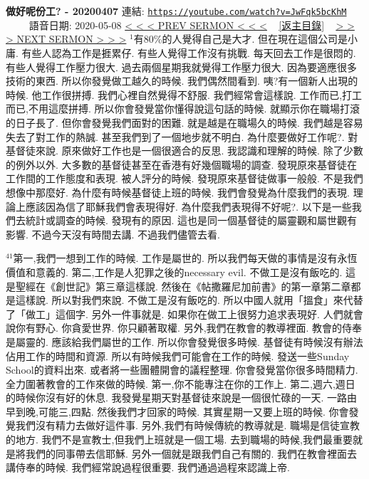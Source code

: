 \documentclass{book}
\begin{document}
\section{}
\label{sec:JwFqk5bcKhM}
\textbf{做好呢份工? - 20200407}
\newline
\newline
連結: \href{https://youtube.com/watch?v=JwFqk5bcKhM}{\texttt{https://youtube.com/watch?v=JwFqk5bcKhM}} ~~~~ 語音日期: 2020-05-08
\newline
\newline
\hyperref[sec:UCyv23j5rVY]{\small{< < < PREV SERMON < < <}}
~
\hyperref[sec:index]{\small{[返主目錄]}}
~
\hyperref[sec:9pqygotXAuo]{\small{> > > NEXT SERMON > > >}}
\newline
\newline
$^{1}$有80\%的人覺得自己是大才.
但在現在這個公司是小庸.
有些人認為工作是捱累仔.
有些人覺得工作沒有挑戰.
每天回去工作是很悶的.
有些人覺得工作壓力很大.
過去兩個星期我就覺得工作壓力很大.
因為要適應很多技術的東西.
所以你發覺做工越久的時候.
我們偶然間看到.
咦?有一個新人出現的時候.
他工作很拼搏.
我們心裡自然覺得不舒服.
我們經常會這樣說.
工作而已,打工而已,不用這麼拼搏.
所以你會發覺當你懂得說這句話的時候.
就顯示你在職場打滾的日子長了.
但你會發覺我們面對的困難.
就是越是在職場久的時候.
我們越是容易失去了對工作的熱誠.
甚至我們到了一個地步就不明白.
為什麼要做好工作呢?.
對基督徒來說.
原來做好工作也是一個很適合的反思.
我認識和理解的時候.
除了少數的例外以外.
大多數的基督徒甚至在香港有好幾個職場的調查.
發現原來基督徒在工作間的工作態度和表現.
被人評分的時候.
發現原來基督徒做事一般般.
不是我們想像中那麼好.
為什麼有時候基督徒上班的時候.
我們會發覺為什麼我們的表現.
理論上應該因為信了耶穌我們會表現得好.
為什麼我們表現得不好呢?.
以下是一些我們去統計或調查的時候.
發現有的原因.
這也是同一個基督徒的屬靈觀和屬世觀有影響.
不過今天沒有時間去講.
不過我們儘管去看.

$^{41}$第一,我們一想到工作的時候.
工作是屬世的.
所以我們每天做的事情是沒有永恆價值和意義的.
第二,工作是人犯罪之後的necessary evil.
不做工是沒有飯吃的.
這是聖經在《創世記》第三章這樣說.
然後在《帖撒羅尼加前書》的第一章第二章都是這樣說.
所以對我們來說.
不做工是沒有飯吃的.
所以中國人就用「搵食」來代替了「做工」這個字.
另外一件事就是.
如果你在做工上很努力追求表現好.
人們就會說你有野心.
你貪愛世界.
你只顧著取權.
另外,我們在教會的教導裡面.
教會的侍奉是屬靈的.
應該給我們屬世的工作.
所以你會發覺很多時候.
基督徒有時候沒有辦法佔用工作的時間和資源.
所以有時候我們可能會在工作的時候.
發送一些Sunday School的資料出來.
或者將一些團體開會的議程整理.
你會發覺當你很多時間精力.
全力圍著教會的工作來做的時候.
第一,你不能專注在你的工作上.
第二,週六,週日的時候你沒有好的休息.
我發覺星期天對基督徒來說是一個很忙碌的一天.
一路由早到晚,可能三,四點.
然後我們才回家的時候.
其實星期一又要上班的時候.
你會發覺我們沒有精力去做好這件事.
另外,我們有時候傳統的教導就是.
職場是信徒宣教的地方.
我們不是宣教士,但我們上班就是一個工場.
去到職場的時候,我們最重要就是將我們的同事帶去信耶穌.
另外一個就是跟我們自己有關的.
我們在教會裡面去講侍奉的時候.
我們經常說過程很重要.
我們通過過程來認識上帝.
\end{document}
